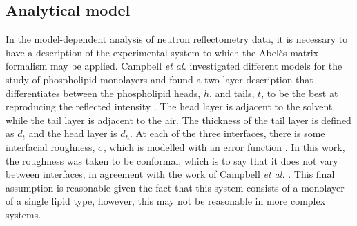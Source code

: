 \documentclass[
 reprint,
 superscriptaddress,
 amsmath,amssymb,
 aps,
]{revtex4-2}
\begin{document}
\subsection{\label{models} Analytical model}

In the model-dependent analysis of neutron reflectometry data, it is necessary to have a description of the experimental system to which the Abel\`{e}s matrix formalism may be applied. 
Campbell \emph{et al.} investigated different models for the study of phospholipid monolayers and found a two-layer description that differentiates between the phospholipid heads, $h$, and tails, $t$, to be the best at reproducing the reflected intensity \cite{campbell_structure_2018}. 
The head layer is adjacent to the solvent, while the tail layer is adjacent to the air. 
The thickness of the tail layer is defined as $d_t$ and the head layer is $d_h$.
At each of the three interfaces, there is some interfacial roughness, $\sigma$, which is modelled with an error function \cite{nevot_caracterisation_1980}.
In this work, the roughness was taken to be conformal, which is to say that it does not vary between interfaces, in agreement with the work of Campbell \emph{et al.} \cite{campbell_structure_2018}.
This final assumption is reasonable given the fact that this system consists of a monolayer of a single lipid type, however, this may not be reasonable in more complex systems. 
\end{document}
